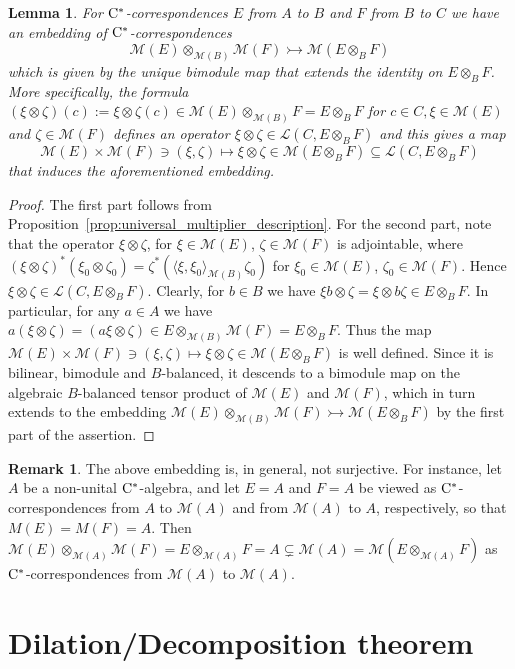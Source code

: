 \documentclass[11 pt, leqno]{amsart}
\numberwithin{equation}{section}
\theoremstyle{plain}
\newtheorem {lem} [thm]{Lemma}
\theoremstyle{definition}
\newtheorem {rem} [thm]{Remark}
\newcommand{\M}{\mathcal M}
\renewcommand{\L}{\mathcal L}
\newcommand{\cst}{\ifmmode\mathrm{C}^*\else{$\mathrm{C}^*$}\fi}
\newcommand*{\into}{\rightarrowtail}
\begin{document}
\begin{lem}\label{lem:multiplier_tensor_product}
For $\cst$-correspondences $E$ from $A$ to $B$ and $F$ from $B$ to $C$ we have an embedding of $\cst$-correspondences
\[
    \M(E)\otimes_{\M(B)}\M(F)\into \M(E\otimes_B F)
\]
which is given by the unique bimodule map that extends the identity on $E\otimes_{B} F$. 
More specifically, the formula  $(\xi\otimes \zeta)(c):=\xi\otimes \zeta(c)\in \M(E)\otimes_{\M(B)} F=E\otimes_B F$ for $c\in C, \xi \in \M(E)$ and $\zeta \in \M(F)$ defines an operator $\xi\otimes \zeta \in\L(C, E\otimes_B F)$ and this gives a map
\[
    \M(E)\times \M(F)\ni (\xi,\zeta)\longmapsto \xi\otimes \zeta \in \M(E\otimes_B F) \subseteq \L(C, E\otimes_B F)
\]
that induces the aforementioned embedding.
\end{lem}
\begin{proof}
The first part follows from Proposition~\ref{prop:universal_multiplier_description}. 
For the second part, note that the operator $\xi\otimes \zeta$, for $\xi\in \M(E)$, $\zeta \in \M(F)$ is adjointable, where $(\xi\otimes \zeta)^*(\xi_0\otimes \zeta_0)=\zeta^*(\langle\xi,\xi_0\rangle_{\M(B)} \zeta_0)$ for $\xi_0\in \M(E)$, $\zeta_0 \in \M(F)$. 
Hence  $\xi\otimes \zeta\in \L(C, E\otimes_B F)$. 
Clearly, for $b\in B$ we have $\xi b\otimes \zeta= \xi\otimes b \zeta\in E\otimes_B F$. 
In particular, for any $a\in A$ we have $a(\xi\otimes \zeta)=(a\xi\otimes \zeta)\in E\otimes_{\M(B)} \M(F)=E\otimes_B F$. 
Thus the map $\M(E)\times \M(F)\ni (\xi,\zeta)\longmapsto \xi\otimes \zeta \in \M(E\otimes_B F)$ is well defined. Since it is bilinear, bimodule and $B$-balanced, it descends to a bimodule map on the algebraic $B$-balanced tensor product of $\M(E)$ and $\M(F)$, which in turn extends to the embedding $\M(E)\otimes_{\M(B)}\M(F)\into \M(E\otimes_B F)$ by the first part of the assertion. 
\end{proof}

\begin{rem}
The above embedding is, in general, not surjective. 
For instance, let $A$ be a non-unital $\cst$-algebra, and let $E=A$ and $F=A$ be viewed as $\cst$-correspondences from $A$ to $\M(A)$ and from $\M(A)$ to $A$, respectively, so that $M(E)=M(F) = A$. 
Then $\M(E) \otimes_{\M(A)} \M(F) = E \otimes_{\M(A)} F = A \subsetneq \M(A) = \M(E\otimes_{\M(A)}F)$ as $\cst$-correspondences from $\M(A)$ to $\M(A)$.
\end{rem}


%
%
\section{Dilation/Decomposition theorem} 
\label{sec:decomp}
\end{document}
